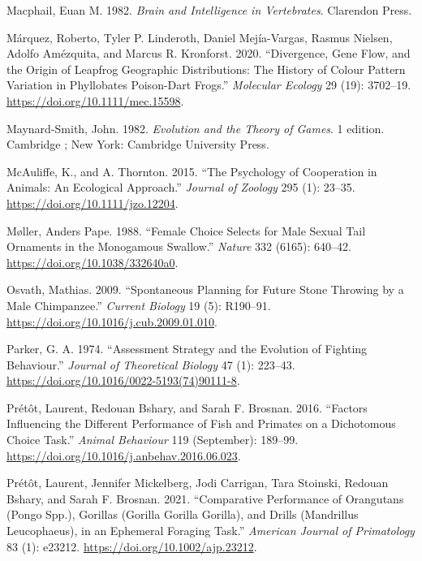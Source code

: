 \documentclass[
  12pt,
]{article}
\newlength{\cslhangindent}
\newlength{\cslentryspacingunit} %
\newenvironment{CSLReferences}[2] %
 {%
  \setlength{\parindent}{0pt}
  \ifodd #1
  \let\oldpar\par
  \def\par{\hangindent=\cslhangindent\oldpar}
  \fi
  \setlength{\parskip}{#2\cslentryspacingunit}
 }%
 {}
\begin{document}
\begin{CSLReferences}{1}{0}
\leavevmode{}%
Macphail, Euan M. 1982. \emph{Brain and {Intelligence} in
{Vertebrates}}. Clarendon Press.

\leavevmode{}%
Márquez, Roberto, Tyler P. Linderoth, Daniel Mejía-Vargas, Rasmus
Nielsen, Adolfo Amézquita, and Marcus R. Kronforst. 2020. {``Divergence,
Gene Flow, and the Origin of Leapfrog Geographic Distributions: {The}
History of Colour Pattern Variation in {Phyllobates} Poison-Dart
Frogs.''} \emph{Molecular Ecology} 29 (19): 3702--19.
\url{https://doi.org/10.1111/mec.15598}.

\leavevmode{}%
Maynard-Smith, John. 1982. \emph{Evolution and the {Theory} of {Games}}.
1 edition. Cambridge ; New York: Cambridge University Press.

\leavevmode{}%
McAuliffe, K., and A. Thornton. 2015. {``The Psychology of Cooperation
in Animals: An Ecological Approach.''} \emph{Journal of Zoology} 295
(1): 23--35. \url{https://doi.org/10.1111/jzo.12204}.

\leavevmode{}%
Møller, Anders Pape. 1988. {``Female Choice Selects for Male Sexual Tail
Ornaments in the Monogamous Swallow.''} \emph{Nature} 332 (6165):
640--42. \url{https://doi.org/10.1038/332640a0}.

\leavevmode{}%
Osvath, Mathias. 2009. {``Spontaneous Planning for Future Stone Throwing
by a Male Chimpanzee.''} \emph{Current Biology} 19 (5): R190--91.
\url{https://doi.org/10.1016/j.cub.2009.01.010}.

\leavevmode{}%
Parker, G. A. 1974. {``Assessment Strategy and the Evolution of Fighting
Behaviour.''} \emph{Journal of Theoretical Biology} 47 (1): 223--43.
\url{https://doi.org/10.1016/0022-5193(74)90111-8}.

\leavevmode{}%
Prétôt, Laurent, Redouan Bshary, and Sarah F. Brosnan. 2016. {``Factors
Influencing the Different Performance of Fish and Primates on a
Dichotomous Choice Task.''} \emph{Animal Behaviour} 119 (September):
189--99. \url{https://doi.org/10.1016/j.anbehav.2016.06.023}.

\leavevmode{}%
Prétôt, Laurent, Jennifer Mickelberg, Jodi Carrigan, Tara Stoinski,
Redouan Bshary, and Sarah F. Brosnan. 2021. {``Comparative Performance
of Orangutans ({Pongo} Spp.), Gorillas ({Gorilla} Gorilla Gorilla), and
Drills ({Mandrillus} Leucophaeus), in an Ephemeral Foraging Task.''}
\emph{American Journal of Primatology} 83 (1): e23212.
\url{https://doi.org/10.1002/ajp.23212}.


\end{CSLReferences}
\end{document}
